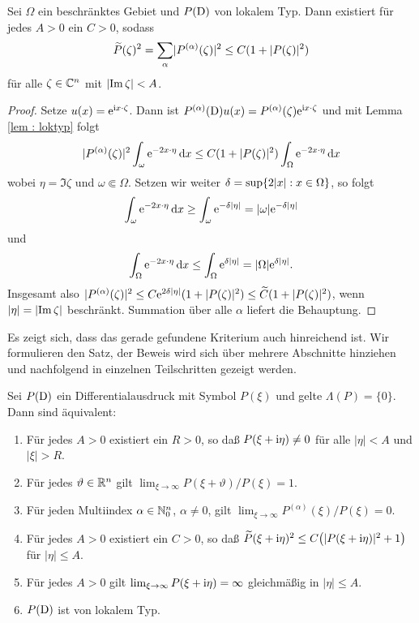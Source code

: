 \begin{lem}
Sei $\Omega$ ein beschränktes Gebiet und $P(\mathrm D)$ von lokalem Typ. Dann existiert für jedes $A>0$ ein $C>0$, sodass
\begin{equation}
\widetilde{P}(\zeta)^2=\sum_\alpha \lvert P^{(\alpha)}(\zeta)\rvert^2\leq C(1+\lvert P(\zeta)\rvert^2)
\end{equation}
für alle $\zeta\in\mathbb C^n$ mit $\lvert\operatorname{Im} \zeta\rvert < A$.
\end{lem}
\begin{proof}
Setze $u(x)=\mathrm e^{\mathrm i x\cdot\zeta}$. Dann ist $P^{(\alpha)}(\mathrm D)u(x)=P^{(\alpha)}(\zeta)\mathrm e^{\mathrm i x\cdot\zeta}$ und mit Lemma \ref{lem : loktyp} folgt
\begin{equation}
\lvert P^{(\alpha)}(\zeta)\rvert^2 \int_{\omega} \mathrm e^{-2x\cdot \eta}\,\mathrm d x \leq C(1+\lvert P(\zeta)\rvert^2)\int_\Omega \mathrm e^{-2x\cdot \eta}\,\mathrm d x
\end{equation}
wobei $\eta = \Im \zeta$ und $\omega\Subset\Omega$. Setzen wir weiter $\delta = \sup \{2\lvert x\rvert:x\in\Omega\}$, so folgt
\begin{equation}
\int_\omega \mathrm e^{-2x\cdot \eta}\,\mathrm d x \geq \int_\omega \mathrm e^{-\delta \lvert\eta\rvert}=\lvert\omega\rvert\mathrm e^{-\delta \lvert\eta\rvert}
\end{equation}
und
\begin{equation}
\int_\Omega \mathrm e^{-2x\cdot \eta}\,\mathrm d x \leq \int_\Omega \mathrm e^{\delta \lvert\eta\rvert}=\lvert\Omega\rvert\mathrm e^{\delta \lvert\eta\rvert}.
\end{equation}
Insgesamt also $\lvert P^{(\alpha)}(\zeta)\rvert^2\leq C\mathrm e^{2\delta \lvert\eta\rvert}(1+\lvert P(\zeta)\rvert^2)\leq \widetilde{C}(1+\lvert P(\zeta)\rvert^2) $, wenn $\lvert\eta\rvert=\lvert\operatorname{Im} \zeta\rvert$ beschränkt. Summation über alle $\alpha$ liefert die Behauptung.
\end{proof}


%
%

Es zeigt sich, dass das gerade gefundene Kriterium auch hinreichend ist. Wir formulieren den Satz, der Beweis wird sich über mehrere Abschnitte hinziehen und nachfolgend in einzelnen Teilschritten gezeigt werden.

\begin{thm}\label{thm:3:3.3}
Sei $P(\mathrm D)$ ein Differentialausdruck mit Symbol $P(\xi)$ und gelte $\Lambda(P)=\{0\}$. Dann sind \"aquivalent:
\begin{enumerate}
\item Für jedes $A>0$ existiert ein $R>0$, so daß $P(\xi+\mathrm i\eta)\ne0$ für alle $|\eta|<A$ und $|\xi|>R$.
\item Für jedes $\vartheta\in\mathbb R^n$ gilt $\lim_{\xi\to\infty} P(\xi+\vartheta)/P(\xi)=1$.
\item Für jeden Multiindex $\alpha\in\mathbb N_0^n$, $\alpha\ne0$, gilt $\lim_{\xi\to\infty} P^{(\alpha)}(\xi)/P(\xi)=0$.
\item Für jedes $A>0$ existiert ein $C>0$, so daß $\widetilde P(\xi+\mathrm i\eta)^2\le C\big(|P(\xi+\mathrm i\eta)|^2+1\big)$ für $|\eta|\le A$.
\item Für jedes $A>0$ gilt $\lim_{\xi\to\infty} P(\xi+\mathrm i\eta)=\infty$ gleichmäßig in $|\eta|\le A$.
\item $P(\mathrm D)$ ist von lokalem Typ.
\end{enumerate}
\end{thm} 

